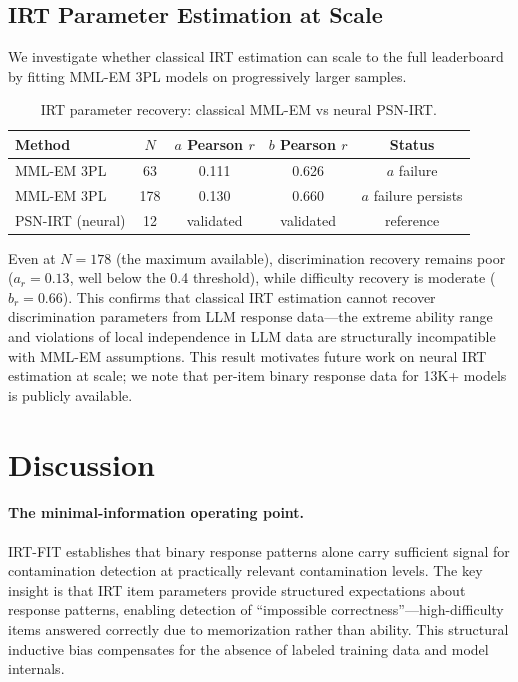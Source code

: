 \documentclass[11pt,a4paper]{article}
\begin{document}
\subsection{IRT Parameter Estimation at Scale}
\label{sec:refit}

We investigate whether classical IRT estimation can scale to the full leaderboard by fitting MML-EM 3PL models on progressively larger samples.

\begin{table}[h]
\centering
\small
\caption{IRT parameter recovery: classical MML-EM vs neural PSN-IRT.}
\label{tab:refit}
\begin{tabular}{lcccc}
\toprule
\textbf{Method} & $N$ & $a$ Pearson $r$ & $b$ Pearson $r$ & \textbf{Status} \\
\midrule
MML-EM 3PL & 63 & 0.111 & 0.626 & $a$ failure \\
MML-EM 3PL & 178 & 0.130 & 0.660 & $a$ failure persists \\
PSN-IRT (neural) & 12 & validated & validated & reference \\
\bottomrule
\end{tabular}
\end{table}

Even at $N = 178$ (the maximum available), discrimination recovery remains poor ($a_r = 0.13$, well below the 0.4 threshold), while difficulty recovery is moderate ($b_r = 0.66$).
This confirms that classical IRT estimation cannot recover discrimination parameters from LLM response data---the extreme ability range and violations of local independence in LLM data are structurally incompatible with MML-EM assumptions.
This result motivates future work on neural IRT estimation at scale; we note that per-item binary response data for 13K+ models is publicly available.

\section{Discussion}
\label{sec:discussion}

\paragraph{The minimal-information operating point.}
IRT-FIT establishes that binary response patterns alone carry sufficient signal for contamination detection at practically relevant contamination levels.
The key insight is that IRT item parameters provide structured expectations about response patterns, enabling detection of ``impossible correctness''---high-difficulty items answered correctly due to memorization rather than ability.
This structural inductive bias compensates for the absence of labeled training data and model internals.
\end{document}
